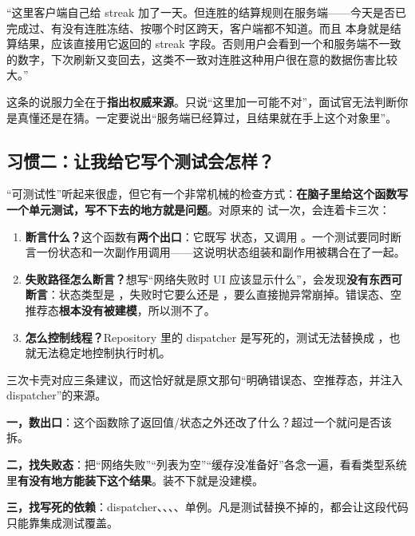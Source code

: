 \begin{sayit}[怎么说这一条]
“这里客户端自己给 streak 加了一天。但连胜的结算规则在服务端——今天是否已完成过、有没有连胜冻结、按哪个时区跨天，客户端都不知道。而且  本身就是结算结果，应该直接用它返回的 streak 字段。否则用户会看到一个和服务端不一致的数字，下次刷新又变回去，这类不一致对连胜这种用户很在意的数据伤害比较大。”
\end{sayit}

\begin{pitfall}
这条的说服力全在于\textbf{指出权威来源}。只说“这里加一可能不对”，面试官无法判断你是真懂还是在猜。一定要说出“服务端已经算过，且结果就在手上这个对象里”。
\end{pitfall}

\subsection{习惯二：让我给它写个测试会怎样？}

“可测试性”听起来很虚，但它有一个非常机械的检查方式：\textbf{在脑子里给这个函数写一个单元测试，写不下去的地方就是问题}。对原来的  试一次，会连着卡三次：

\begin{enumerate}
  \item \textbf{断言什么？}这个函数有\textbf{两个出口}：它既写  状态，又调用 。一个测试要同时断言一份状态和一次副作用调用——这说明状态组装和副作用被耦合在了一起。
  \item \textbf{失败路径怎么断言？}想写“网络失败时 UI 应该显示什么”，会发现\textbf{没有东西可断言}：状态类型是 ，失败时它要么还是 ，要么直接抛异常崩掉。错误态、空推荐态\textbf{根本没有被建模}，所以测不了。
  \item \textbf{怎么控制线程？}Repository 里的 dispatcher 是写死的，测试无法替换成 ，也就无法稳定地控制执行时机。
\end{enumerate}

三次卡壳对应三条建议，而这恰好就是原文那句“明确错误态、空推荐态，并注入 dispatcher”的来源。

\begin{idea}
\textbf{一，数出口}：这个函数除了返回值/状态之外还改了什么？超过一个就问是否该拆。\par
\textbf{二，找失败态}：把“网络失败”“列表为空”“缓存没准备好”各念一遍，看看类型系统里\textbf{有没有地方能装下这个结果}。装不下就是没建模。\par
\textbf{三，找写死的依赖}：dispatcher、、、、单例。凡是测试替换不掉的，都会让这段代码只能靠集成测试覆盖。
\end{idea}

